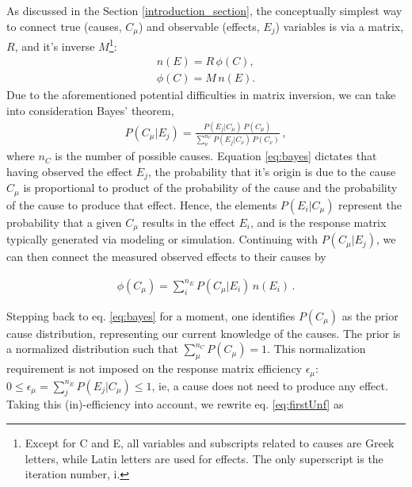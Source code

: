 As discussed in the Section \ref{introduction_section}, the conceptually simplest way to connect
true (causes, $C_{\mu}$) and observable (effects, $E_{j}$) variables is via a 
matrix, $R$, and it's inverse $M$\footnote{\label{fnote1} Except for C and E, all variables and subscripts related to causes are Greek letters, while Latin letters are used for effects. The only superscript is the iteration number, i.}:
\begin{equation}
 \begin{split}
  n(E)=R \, \phi(C), \\
  \phi(C)=M \, n(E).
 \end{split}
\end{equation} 
Due to the aforementioned potential difficulties in matrix inversion, we can take
into consideration Bayes' theorem,
\begin{equation} \label{eq:bayes}
 \begin{split}
  P(C_{\mu}|E_{j})=\frac{P(E_{j}|C_{\mu}) \, P(C_{\mu})}{\sum_{\nu}^{n_{C}} P(E_{j}|C_{\nu}) \, P(C_{\nu})} \, ,
 \end{split}
\end{equation}
where $n_{C}$ is the number of possible causes.
Equation \ref{eq:bayes} dictates that having observed the effect $E_{j}$, the probability that it's origin is due
to the cause $C_{\mu}$ is proportional to product of the probability of the cause and the probability
of the cause to produce that effect. Hence, the elements $P(E_{i}|C_{\mu})$ represent the probability that a given 
$C_{\mu}$ results in the effect $E_{i}$, and is the response matrix typically generated via modeling or simulation.
Continuing with $P(C_{\mu}|E_{j})$, we can then connect the measured observed effects to their causes by

\begin{equation} \label{eq:firstUnf}
 \begin{split}
  \phi(C_{\mu}) = \sum_{i}^{n_{E}} P(C_{\mu}|E_{i}) \, n(E_{i}) \, .
 \end{split}
\end{equation}

Stepping back to eq. \ref{eq:bayes} for a moment, one identifies $P(C_{\mu})$ as the prior cause distribution, representing our current 
knowledge of the causes. The prior is a normalized distribution such that $\sum_{\mu}^{n_{C}}P(C_{\mu})=1$. 
This normalization requirement is not imposed on the response matrix efficiency $\epsilon_{\mu}$: 
$0 \leq \epsilon_{\mu} = \sum_{j}^{n_{E}}P(E_{j}|C_{\mu}) \leq 1$, 
ie, a cause does not need to produce any effect. Taking this (in)-efficiency into account, we rewrite eq. \ref{eq:firstUnf} as

